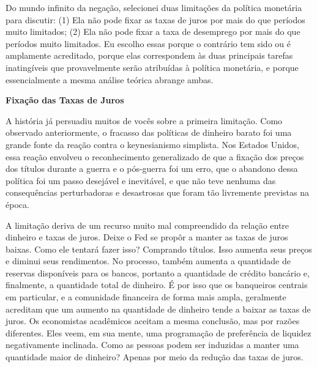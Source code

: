 \documentclass[12pt]{article}
\begin{document}
Do mundo infinito da negação, selecionei duas limitações da política monetária para discutir: (1) Ela não pode fixar as taxas de juros por mais do que períodos muito limitados; (2) Ela não pode fixar a taxa de desemprego por mais do que períodos muito limitados. Eu escolho essas porque o contrário tem sido ou é amplamente acreditado, porque elas correspondem às duas principais tarefas inatingíveis que provavelmente serão atribuídas à política monetária, e porque essencialmente a mesma análise teórica abrange ambas.

\textbf{Fixação das Taxas de Juros}

A história já persuadiu muitos de vocês sobre a primeira limitação. Como observado anteriormente, o fracasso das políticas de dinheiro barato foi uma grande fonte da reação contra o keynesianismo simplista. Nos Estados Unidos, essa reação envolveu o reconhecimento generalizado de que a fixação dos preços dos títulos durante a guerra e o pós-guerra foi um erro, que o abandono dessa política foi um passo desejável e inevitável, e que não teve nenhuma das consequências perturbadoras e desastrosas que foram tão livremente previstas na época.

A limitação deriva de um recurso muito mal compreendido da relação entre dinheiro e taxas de juros. Deixe o Fed se propôr a manter as taxas de juros baixas. Como ele tentará fazer isso? Comprando títulos. Isso aumenta seus preços e diminui seus rendimentos. No processo, também aumenta a quantidade de reservas disponíveis para os bancos, portanto a quantidade de crédito bancário e, finalmente, a quantidade total de dinheiro. É por isso que os banqueiros centrais em particular, e a comunidade financeira de forma mais ampla, geralmente acreditam que um aumento na quantidade de dinheiro tende a baixar as taxas de juros. Os economistas acadêmicos aceitam a mesma conclusão, mas por razões diferentes. Eles veem, em sua mente, uma programação de preferência de liquidez negativamente inclinada. Como as pessoas podem ser induzidas a manter uma quantidade maior de dinheiro? Apenas por meio da redução das taxas de juros.
\end{document}
